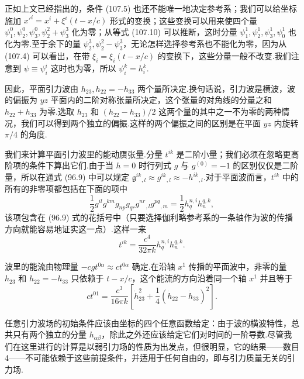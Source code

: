 正如上文已经指出的，条件 (107.5) 也还不能唯一地决定参考系；我们可以给坐标施加 $x'^i=x^i+\xi^i(t-x/c)$ 形式的变换；这些变换可以用来使四个量 $\psi_1^0,\psi_2^0,\psi_3^0,\psi_2^2+\psi_3^3$ 化为零；从等式 (107.10) 可以推断，这时分量 $\psi_1^1,\psi_2^1,\psi_3^1,\psi_0^1$ 也化为零.至于余下的量 $\psi_2^3,\psi_2^2-\psi_3^3$，无论怎样选择参考系也不能化为零，因为从 (107.4) 可以看出，在带 $\xi_i=\xi_i(t-x/c)$ 的变换下，这些分量一般不改变.我们注意到 $\psi\equiv\psi_i^i$ 这时也为零，所以 $\psi_i^k=h_i^k$.

因此，平面引力波由 $h_{23},h_{22}=-h_{33}$ 两个量所决定.换句话说，引力波是横波，波的偏振为 $yz$ 平面内的二阶对称张量所决定，这个张量的对角线的分量之和 $h_{22}+h_{33}$ 为零.选取 $h_{23}$ 和 $(h_{22}-h_{33})/2$ 这两个量的其中之一不为零的两种情况，我们可以得到两个独立的偏振.这样的两个偏振之间的区别是在平面 $yz$ 内旋转 $\pi/4$ 的角度.

我们来计算平面引力波里的能动赝张量.分量 $t^{ik}$ 是二阶小量；我们必须在忽略更高阶项的条件下算出它们.由于当 $h=0$ 时行列式 $g$ 与 $g^{(0)}=-1$ 的区别仅仅是二阶量，所以在通式 (96.9) 中可以规定 $\mathfrak{g}^{ik}{}_{,l}\approx g^{ik}{}_{,l}\approx-h^{ik}{}_{,l}$.对于平面波而言，$t^{ik}$ 中的所有的非零项都包括在下面的项中
\begin{equation*}
  \frac{1}{2}g^{il}g^{km}g_{np}g_{qr}g^{nr}{}_{,l}g^{pq}{}_{,m}
  =\frac{1}{2}h_q^{n,i}h_n^{q,k},
\end{equation*}
该项包含在 (96.9) 式的花括号中（只要选择伽利略参考系的一条轴作为波的传播方向就能容易地证实这一点）.这样一来
\begin{equation}
  t^{ik}=\frac{c^{4}}{32\pi k}h_q^{n,i}h_n^{q,k}.
\end{equation}

波里的能流由物理量 $-cgt^{0\alpha}\approx ct^{0\alpha}$ 确定.在沿轴 $x^{1}$ 传播的平面波中，非零的量 $h_{23}$ 和 $h_{22}=-h_{33}$ 只依赖于 $t-x/c$，这个能流的方向沿着同一个轴 $x^{1}$ 并且等于
\begin{equation}
  ct^{01}=\frac{c^{3}}{16\pi k}\left[\dot{h}_{23}^{2}
  +\frac{1}{4}(\dot{h}_{22}-\dot{h}_{33})^{2}\right].
\end{equation}

任意引力波场的初始条件应该由坐标的四个任意函数给定：由于波的横波特性，总共只有两个独立的分量 $h_{\alpha\beta}$，除此之外还应该给定它们对时间的一阶导数.尽管我们在这里进行的计算是以弱引力场的性质为出发点，但很明显，它的结果——数目 4——不可能依赖于这些前提条件，并适用于任何自由的，即与引力质量无关的引力场.

